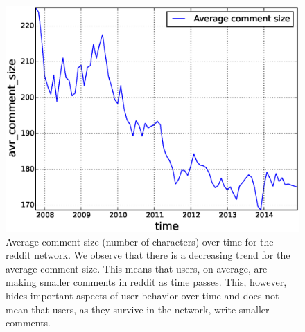 \begin{figure}[!tb]
\centering
\includegraphics[scale=0.4]{./images/avr_comment_size_over_time_total.eps}
\caption{Average comment size (number of characters) over time for the reddit network. We observe that there is a decreasing trend for the average comment size. This means that users, on average, are making smaller comments in reddit as time passes. This, however, hides important aspects of user behavior over time and does not mean that users, as they survive in the network, write smaller comments.}
\label{fig:avr_comment_size_over_time_total}
\end{figure}


